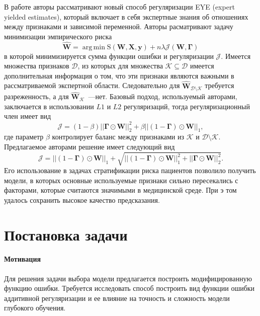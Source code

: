 \documentclass[12pt, twoside]{article}
\newcommand{\X}{\mathbf{X}}
\newcommand{\w}{{\mathbf{W}}}
\DeclareMathOperator*{\argmin}{arg\,min}
\begin{document}
В работе \cite{wang2018learning} авторы рассматривают новый способ регуляризации EYE (expert yielded estimates), который включает в себя экспертные знания об отношениях между признаками и зависимой переменной. Авторы расматривают задачу минимизации эмпирического риска
\begin{equation}\label{eq1}
\hat{\mathbf{\w}} = \argmin\text{S}(\w,\X,\mathbf{y})+n\lambda\mathcal{J}(\w,\mathbf{\Gamma})
\end{equation}
в которой минимизируется сумма функции ошибки и регуляризации $\mathcal{J}$. Имеется множества признаков $\mathcal{D}$, из которых для множества $\mathcal{K}\subseteq\mathcal{D}$ имеется дополнительная информация о том, что эти признаки являются важными в рассматриваемой экспертной области. Следовательно для $\hat{\mathbf{\w}}_{\mathcal{D}\setminus\mathcal{K}}$ требуется разреженность, а для $\hat{\mathbf{\w}}_{\mathcal{K}}$~---нет. Базовый подход, используемый авторами, заключается в использовании $L1$ и $L2$ регуляризаций, тогда регуляризационный член имеет вид
\begin{equation}\label{eq2}
\mathcal{J} = (1-\beta)||\mathbf{\Gamma}\odot\w||^2_2+\beta||(1-\mathbf{\Gamma})\odot\w||_1,
\end{equation}
где параметр $\beta$ контролирует баланс между признаками из $\mathcal{K}$ и $\mathcal{D}\setminus\mathcal{K}$. Предлагаемое авторами решение имеет следующий вид
\begin{equation}\label{eq3}
\mathcal{J} = ||(1-\mathbf{\Gamma})\odot\w||_1 + \sqrt{ ||(1-\mathbf{\Gamma})\odot\w||^2_1+||\mathbf{\Gamma}\odot\w||^2_2}.
\end{equation}
Его  использование в задачах стратификации риска пациентов позволило получить модели, в которых основные используемые признаки сильно пересекались с факторами, которые считаются значимыми в медицинской среде. При э том удалось сохранить высокое качество предсказания.

\section{Постановка задачи}
\paragraph{Мотивация}
Для решения задачи выбора модели предлагается построить модифицированную функцию ошибки.
Требуется исследовать способ построить вид функции ошибки аддитивной регуляризации и ее влияние на точность и сложность модели глубокого обучения.
\end{document}
